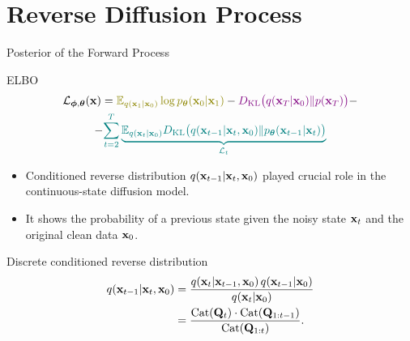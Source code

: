 \documentclass{beamer}
\renewcommand{\eqpause}{}
\begin{document}
\section{Reverse Diffusion Process}
\begin{frame}{Posterior of the Forward Process}
	\begin{block}{ELBO}
		\vspace{-0.7cm}
		\begin{multline*}
            \cL_{\bphi, \btheta}(\bx) =  {\color{olive}\bbE_{q(\bx_1 | \bx_0)} \log \pt(\bx_0 | \bx_1)} - {\color{violet}\KL\bigl(q(\bx_T | \bx_0) \| p(\bx_T)\bigr)} - \\
            - {\color{teal}\sum_{t=2}^T \underbrace{ \bbE_{q(\bx_t | \bx_0)} \KL \bigl(q(\bx_{t-1} | \bx_t, \bx_0) \| \pt(\bx_{t-1} | \bx_t)\bigr)}_{\cL_t}}
        \end{multline*}
		\vspace{-0.7cm}
	\end{block}
	\eqpause
	\begin{itemize}
		\item Conditioned reverse distribution $q(\mathbf{x}_{t-1} | \mathbf{x}_t, \mathbf{x}_0)$ played crucial role in the continuous-state diffusion model.
		\item It shows the probability of a previous state given the noisy state $\mathbf{x}_t$ and the original clean data $\mathbf{x}_0$.
	\end{itemize}
	\eqpause
	\begin{block}{Discrete conditioned reverse distribution}
		\vspace{-0.7cm}
		\begin{align*}
			q(\mathbf{x}_{t-1} | \mathbf{x}_t, \mathbf{x}_0)
			&= \frac{q(\mathbf{x}_t | \mathbf{x}_{t-1}, \mathbf{x}_0)\, q(\mathbf{x}_{t-1} | \mathbf{x}_0)}
			        {q(\mathbf{x}_t | \mathbf{x}_0)} \\
			&= \frac{\operatorname{Cat}(\mathbf{Q}_t) \cdot \operatorname{Cat}(\mathbf{Q}_{1:t-1})}{\operatorname{Cat}(\mathbf{Q}_{1:t})}.
		\end{align*}
	\end{block}
\end{frame}
\end{document}
